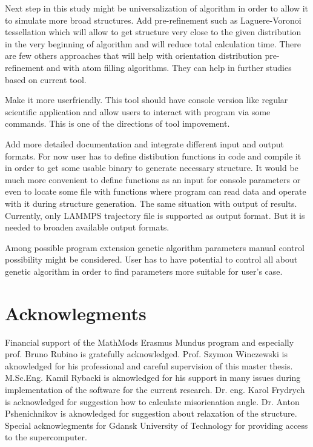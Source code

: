 \documentclass[12pt]{report}
\begin{document}
Next step in this study might be universalization of algorithm in order to allow it to simulate more broad structures. Add pre-refinement such as Laguere-Voronoi tessellation which will allow to get structure very close to the given distribution in the very beginning of algorithm and will reduce total calculation time. There are few others approaches that will help with orientation distribution pre-refinement and with atom filling algorithms. They can help in further studies based on current tool.

Make it more userfriendly. This tool should have console version like regular scientific application and allow users to interact with program via some commands. This is one of the directions of tool impovement.

Add more detailed documentation and integrate different input and output formats. For now user has to define distibution functions in code and compile it in order to get some usable binary to generate necessary structure. It would be much more convenient to define functions as an input for console parameters or even to locate some file with functions where program can read data and operate with it during structure generation. The same situation with output of results. Currently, only LAMMPS trajectory file is supported as output format. But it is needed to broaden available output formats.

Among possible program extension genetic algorithm parameters manual control possibility might be considered. User has to have potential to control all about genetic algorithm in order to find parameters more suitable for user's case.

\section{Acknowlegments}

Financial support of the MathMods Erasmus Mundus program and especially prof. Bruno Rubino is gratefully acknowledged. Prof. Szymon Winczewski is aknowledged for his professional and careful supervision of this master thesis. M.Sc.Eng. Kamil Rybacki is aknowledged for his support in many issues during implementation of the software for the current research. Dr. eng. Karol Frydrych is acknowledged for suggestion how to calculate misorienation angle. Dr. Anton Pshenichnikov is aknowledged for suggestion about relaxation of the structure. Special acknowlegments for Gdansk University of Technology for providing access to the supercomputer.
\end{document}
